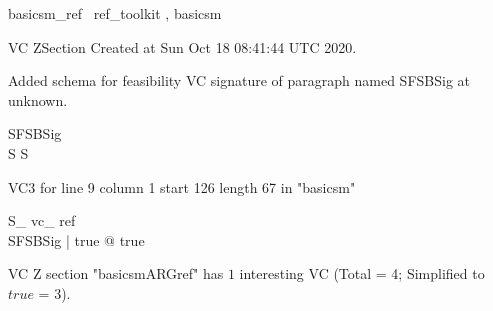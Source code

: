 \documentclass{article}
\begin{document}

\begin{zsection}	 \SECTION basicsm\_ref \parents~ref\_toolkit , basicsm
\end{zsection}

VC ZSection Created at Sun Oct 18 08:41:44 UTC 2020.


Added schema for feasibility VC signature of paragraph named SFSBSig at unknown.
\begin{schema}{SFSBSig}
\\
 S 
\where
 S
\end{schema}

VC3 for line 9 column 1 start 126 length 67 in "basicsm"
\begin{theorem}{ S\_ vc\_ ref}\\
 \exists SFSBSig | true @ true \\

\end{theorem}



 VC Z section "basicsmARGref" has $1$ interesting VC (Total = 4; Simplified to $true$ = 3).



\end{document}
